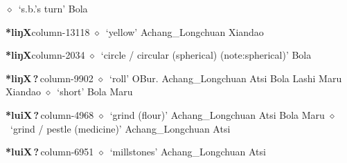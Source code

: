          $\diamond$~`s.b.'s turn'
         Bola 
  \item {\footnotesize \textbf{*liŋX}}{\tiny column-13118}
         $\diamond$~`yellow'
         Achang\_Longchuan 
\hspace{1ex}
         Xiandao 
  \item {\footnotesize \textbf{*liŋX}}{\tiny column-2034}
         $\diamond$~`circle / circular (spherical) (note:spherical)'
         Bola 
  \item {\footnotesize \textbf{*liŋX\,?\,}}{\tiny column-9902}
         $\diamond$~`roll'
         OBur. 
\hspace{1ex}
         Achang\_Longchuan 
\hspace{1ex}
         Atsi 
\hspace{1ex}
         Bola 
\hspace{1ex}
         Lashi 
\hspace{1ex}
         Maru 
\hspace{1ex}
         Xiandao 
\hspace{1ex}
         $\diamond$~`short'
         Bola 
\hspace{1ex}
         Maru 
  \item {\footnotesize \textbf{*luiX\,?\,}}{\tiny column-4968}
         $\diamond$~`grind (flour)'
         Achang\_Longchuan 
\hspace{1ex}
         Atsi 
\hspace{1ex}
         Bola 
\hspace{1ex}
         Maru 
\hspace{1ex}
         $\diamond$~`grind / pestle (medicine)'
         Achang\_Longchuan 
\hspace{1ex}
         Atsi 
  \item {\footnotesize \textbf{*luiX\,?\,}}{\tiny column-6951}
         $\diamond$~`millstones'
         Achang\_Longchuan 
\hspace{1ex}
         Atsi 
